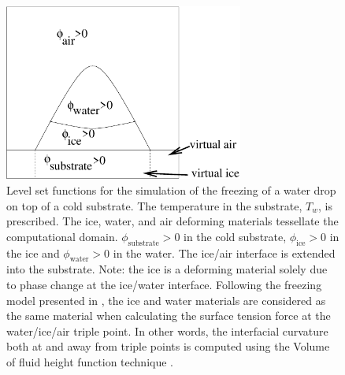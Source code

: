 \documentclass[]{article}
\begin{document}
\begin{figure}[htbp]
  \centering
    \includegraphics[width=0.7\textwidth]{ice_levelset.eps}
        \caption{Level set functions for the simulation of 
	the freezing of a water drop on top of a cold substrate.
	The temperature in the substrate, $T_{w}$, is prescribed.
        The ice, water, and air deforming materials tessellate
        the computational domain.
        $\phi_{\mbox{substrate}}>0$ in the cold substrate,
        $\phi_{\mbox{ice}}>0$ in the ice and 
        $\phi_{\mbox{water}}>0$ in the water.  The
        ice/air interface is extended into the substrate.
        Note: the ice is a deforming material solely due to 
        phase change at the ice/water interface.
        Following the freezing model presented in \cite{lyu2021hybrid}, the
        ice and water materials are considered as the same
        material when calculating the surface tension force 
        at the water/ice/air triple point.
        In other words, the interfacial
        curvature both at and away from triple points is computed using
        the Volume of fluid height function technique
        \cite{sussman2003second}.
    }
  \label{ice_levelset}
\end{figure}
\end{document}
